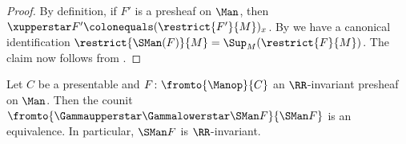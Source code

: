 \begin{proof}
	By definition, if $ F' $ is a presheaf on $ \Man $, then $ \xupperstar F' \colonequals (\restrict{F'}{M})_x $.
	By  we have a canonical identification $ \restrict{\SMan(F)}{M} = \Sup_{M}(\restrict{F}{M}) $.
	The claim now follows from .
\end{proof}

\begin{proposition}\label{app.prop:sheafificationofinvariantisinvariant}
	Let $ C $ be a presentable \category and $ F \colon \fromto{\Manop}{C} $ an $ \RR $-invariant presheaf on $ \Man $.
	Then the counit $ \fromto{\Gammaupperstar \Gammalowerstar \SMan F}{\SMan F} $ is an equivalence.
	In particular, $ \SMan F $ is $ \RR $-invariant.
\end{proposition}

